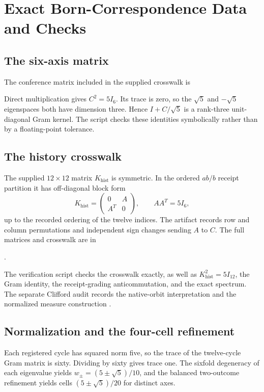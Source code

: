 \section{Exact Born-Correspondence Data and Checks}
\label{app:born}
\subsection{The six-axis matrix}
The conference matrix included in the supplied crosswalk is

Direct multiplication gives $C^2=5I_6$. Its trace is zero, so the $\sqrt5$ and $-\sqrt5$ eigenspaces both have dimension three. Hence $I+C/\sqrt5$ is a rank-three unit-diagonal Gram kernel. The script checks these identities symbolically rather than by a floating-point tolerance.

\subsection{The history crosswalk}
The supplied $12\times12$ matrix $K_{\mathrm{hist}}$ is symmetric. In the ordered $ab/b$ receipt partition it has off-diagonal block form
\[
K_{\mathrm{hist}}=\begin{pmatrix}0&A\\A^T&0\end{pmatrix},
\qquad AA^T=5I_6,
\]
up to the recorded ordering of the twelve indices. The artifact records row and column permutations and independent sign changes sending $A$ to $C$. The full matrices and crosswalk are in
\begin{center}
.
\end{center}
The verification script checks the crosswalk exactly, as well as $K_{\mathrm{hist}}^2=5I_{12}$, the Gram identity, the receipt-grading anticommutation, and the exact spectrum. The separate Clifford audit records the native-orbit interpretation and the normalized measure construction \cite{historyconference,historyclifford}.

\subsection{Normalization and the four-cell refinement}
Each registered cycle has squared norm five, so the trace of the twelve-cycle Gram matrix is sixty. Dividing by sixty gives trace one. The sixfold degeneracy of each eigenvalue yields $w_\pm=(5\pm\sqrt5)/10$, and the balanced two-outcome refinement yields cells $(5\pm\sqrt5)/20$ for distinct axes.

